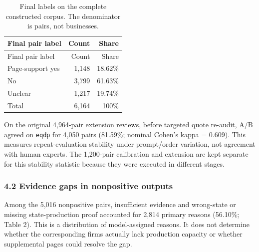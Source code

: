 \documentclass[10pt]{article}
\begin{document}
\begin{longtable}[]{@{}lrr@{}}
\caption{Final labels on the complete constructed corpus. The denominator is pairs, not businesses.}\tabularnewline
\toprule\noalign{}
Final pair label & Count & Share \\
\midrule\noalign{}
\endfirsthead
\toprule\noalign{}
Final pair label & Count & Share \\
\midrule\noalign{}
\endhead
\bottomrule\noalign{}
\endlastfoot
Page-support yes & 1,148 & 18.62\% \\
No & 3,799 & 61.63\% \\
Unclear & 1,217 & 19.74\% \\
Total & 6,164 & 100\% \\
\end{longtable}

On the original 4,964-pair extension reviews, before targeted quote re-audit, A/B agreed on \texttt{eqdp} for 4,050 pairs (81.59\%; nominal Cohen's kappa = 0.609). This measures repeat-evaluation stability under prompt/order variation, not agreement with human experts. The 1,200-pair calibration and extension are kept separate for this stability statistic because they were executed in different stages.

\hypertarget{evidence-gaps-in-nonpositive-outputs}{%
\subsubsection{4.2 Evidence gaps in nonpositive outputs}\label{evidence-gaps-in-nonpositive-outputs}}

Among the 5,016 nonpositive pairs, insufficient evidence and wrong-state or missing state-production proof accounted for 2,814 primary reasons (56.10\%; Table 2). This is a distribution of model-assigned reasons. It does not determine whether the corresponding firms actually lack production capacity or whether supplemental pages could resolve the gap.
\end{document}
